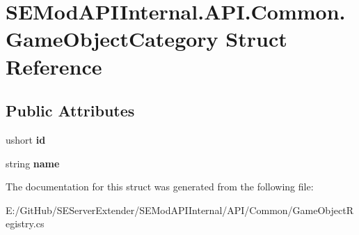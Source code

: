 \hypertarget{struct_s_e_mod_a_p_i_internal_1_1_a_p_i_1_1_common_1_1_game_object_category}{}\section{S\+E\+Mod\+A\+P\+I\+Internal.\+A\+P\+I.\+Common.\+Game\+Object\+Category Struct Reference}
\label{struct_s_e_mod_a_p_i_internal_1_1_a_p_i_1_1_common_1_1_game_object_category}
\subsection*{Public Attributes}
\begin{DoxyCompactItemize}
\item 
\hypertarget{struct_s_e_mod_a_p_i_internal_1_1_a_p_i_1_1_common_1_1_game_object_category_aa0b002a2f714e6a7e113c42aff31fa22}{}ushort {\bfseries id}\label{struct_s_e_mod_a_p_i_internal_1_1_a_p_i_1_1_common_1_1_game_object_category_aa0b002a2f714e6a7e113c42aff31fa22}

\item 
\hypertarget{struct_s_e_mod_a_p_i_internal_1_1_a_p_i_1_1_common_1_1_game_object_category_a82992ca84fdd6832344e56f53b952cd1}{}string {\bfseries name}\label{struct_s_e_mod_a_p_i_internal_1_1_a_p_i_1_1_common_1_1_game_object_category_a82992ca84fdd6832344e56f53b952cd1}

\end{DoxyCompactItemize}


The documentation for this struct was generated from the following file\+:\begin{DoxyCompactItemize}
\item 
E\+:/\+Git\+Hub/\+S\+E\+Server\+Extender/\+S\+E\+Mod\+A\+P\+I\+Internal/\+A\+P\+I/\+Common/Game\+Object\+Registry.\+cs\end{DoxyCompactItemize}

